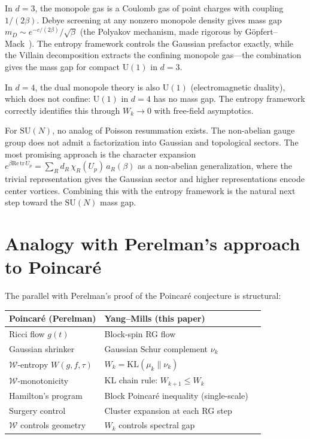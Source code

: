\documentclass[11pt]{article}
\theoremstyle{definition}
\newcommand{\KL}{\mathrm{KL}}
\begin{document}
In $d=3$, the monopole gas is a Coulomb gas of point charges 
with coupling $1/(2\beta)$.  Debye screening at any nonzero 
monopole density gives mass gap 
$m_D \sim e^{-c/(2\beta)}/\sqrt{\beta}$ (the Polyakov mechanism, 
made rigorous by G\"opfert--Mack~\cite{gopfert_mack}).  
The entropy framework controls the Gaussian prefactor exactly, 
while the Villain decomposition extracts the confining monopole 
gas---the combination gives the mass gap for compact $\mathrm{U}(1)$ in $d=3$.

In $d=4$, the dual monopole theory is also $\mathrm{U}(1)$ 
(electromagnetic duality), which does not confine: 
$\mathrm{U}(1)$ in $d=4$ has no mass gap.  The entropy framework 
correctly identifies this through $W_k \to 0$ with free-field asymptotics.

For $\mathrm{SU}(N)$, no analog of Poisson resummation exists.  
The non-abelian gauge group does not admit a factorization into 
Gaussian and topological sectors.  The most promising approach is 
the character expansion
$e^{\beta \mathrm{Re}\,\mathrm{tr}\,U_p} = \sum_R d_R\,\chi_R(U_p)\,a_R(\beta)$
as a non-abelian generalization, where the trivial representation 
gives the Gaussian sector and higher representations encode center 
vortices.  Combining this with the entropy framework is the natural 
next step toward the $\mathrm{SU}(N)$ mass gap.

\section{Analogy with Perelman's approach to Poincar\'e}\label{sec:perelman}

The parallel with Perelman's proof of the Poincar\'e conjecture is structural:

\begin{center}
\begin{tabular}{lll}
\toprule
\textbf{Poincar\'e (Perelman)} & \textbf{Yang--Mills (this paper)} \\
\midrule
Ricci flow $g(t)$ & Block-spin RG flow \\
Gaussian shrinker & Gaussian Schur complement $\nu_k$ \\
$\mathcal{W}$-entropy $W(g, f, \tau)$ & $W_k = \KL(\mu_k \| \nu_k)$ \\
$\mathcal{W}$-monotonicity & KL chain rule: $W_{k+1} \leq W_k$ \\
Hamilton's program & Block Poincar\'e inequality (single-scale) \\
Surgery control & Cluster expansion at each RG step \\
$\mathcal{W}$ controls geometry & $W_k$ controls spectral gap \\
\bottomrule
\end{tabular}
\end{center}
\end{document}
